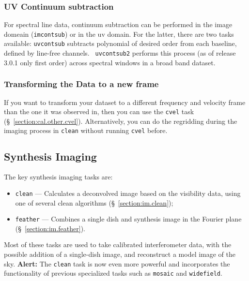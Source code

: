 \subsubsection{UV Continuum subtraction}
\label{section:intro.walkthru.calib.uvcontsub}

For spectral line data, continuum subtraction can be performed in the
image domeain ({\tt imcontsub}) or in the uv domain. For the latter,
there are two tasks available: {\tt uvcontsub} subtracts polynomial of
desired order from each baseline, defined by line-free channels. {\tt
  uvcontsub2} performs this process (as of release 3.0.1 only first
order) across spectral windows in a broad band dataset.


\subsubsection{Transforming the Data to a new frame}
\label{section:intro.walkthru.calib.cvel}

If you want to transform your dataset to a different frequency and
velocity frame than the one it was observed in, then you can use
the {\tt cvel} task
(\S~\ref{section:cal.other.cvel}). Alternatively, you can do the
regridding during the imaging process in {\tt clean} without running
{\tt cvel} before.


\subsection{Synthesis Imaging}
\label{section:intro.walkthru.image}

The key synthesis imaging tasks are:
\begin{itemize}
   \item {\tt clean} --- Calculates a deconvolved image based on the visibility
         data, using one of several clean algorithms  
         (\S~\ref{section:im.clean});
   \item {\tt feather} --- Combines a single dish and synthesis image in the
         Fourier plane (\S~\ref{section:im.feather}).
\end{itemize}
Most of these tasks are used to take calibrated interferometer data, with the
possible addition of a single-dish image, and reconstruct a model
image of the sky. {\bf Alert:} The {\tt clean} task is now even more
powerful and incorporates the functionality of previous specialized
tasks such as {\tt mosaic} and {\tt widefield}.

